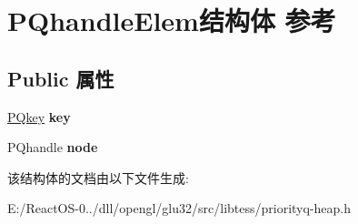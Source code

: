 \hypertarget{struct_p_qhandle_elem}{}\section{P\+Qhandle\+Elem结构体 参考}
\label{struct_p_qhandle_elem}
\subsection*{Public 属性}
\begin{DoxyCompactItemize}
\item 
\mbox{\label{struct_p_qhandle_elem_a60f1656d489a6d9939ff56c944465035}} 
\hyperlink{interfacevoid}{P\+Qkey} {\bfseries key}
\item 
\mbox{\label{struct_p_qhandle_elem_a97edb5a740b17471344f8ce2f61e6e3f}} 
P\+Qhandle {\bfseries node}
\end{DoxyCompactItemize}


该结构体的文档由以下文件生成\+:\begin{DoxyCompactItemize}
\item 
E\+:/\+React\+O\+S-\/0../dll/opengl/glu32/src/libtess/priorityq-\/heap.\+h\end{DoxyCompactItemize}
